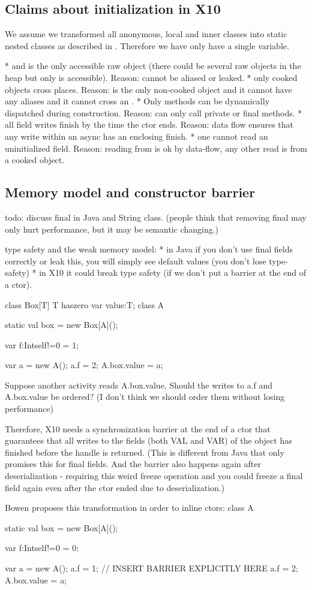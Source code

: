 \subsection{Claims about initialization in X10}
We assume we transformed all anonymous, local and inner classes into static nested classes
    as described in .
Therefore we have only have a single \this variable.


* \this and  is the only accessible raw object (there could be several raw objects in the heap but only \this is accessible). Reason: \this cannot be aliased or leaked.
* only cooked objects cross places. Reason: \this is the only non-cooked object and it cannot have any aliases and it cannot cross an .
* Only  methods can be dynamically dispatched during construction. Reason: can only call private or final methods.
* all field writes finish by the time the ctor ends. Reason: data flow ensures that any write within an async has an enclosing finish.
* one cannot read an uninitialized field. Reason: reading from \this is ok by data-flow, any other read is from a cooked object.


\subsection{Memory model and constructor barrier}

todo: discuss final in Java and String class.
(people think that removing final may only hurt performance, but it may be semantic changing.)

type safety and the weak memory model:
* in Java if you don't use final fields correctly or leak this, you will simply see default values (you don't lose type-safety)
* in X10 it could break type safety (if we don't put a barrier at the end of a ctor).

class Box[T] {T haszero} {
  var value:T;
}
class A {
  static val box = new Box[A]();

  var f:Int{self!=0} = 1;
}

var a = new A();
a.f = 2;
A.box.value = a;

Suppose another activity reads A.box.value.
Should the writes to
a.f
and
A.box.value
be ordered? (I don't think we should order them without losing performance)

Therefore, X10 needs a synchronization barrier at the end of a ctor that guarantees that all writes to the fields (both VAL and VAR) of the object has finished before the handle is returned.
(This is different from Java that only promises this for final fields. And the barrier also happens again after deserialization - requiring this weird freeze operation and you could freeze a final field again even after the ctor ended due to deserialization.)


Bowen proposes this transformation in order to inline ctors:
class A {
  static val box = new Box[A]();

  var f:Int{self!=0} = 0;
}


var a = new A();
a.f = 1;
// INSERT BARRIER EXPLICITLY HERE
a.f = 2;
A.box.value = a;
